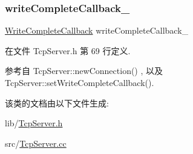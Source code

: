 \mbox{\label{classmuduo_1_1TcpServer_a525f0d11cfa2e271600caa30407b6150}} 
\subsubsection{\texorpdfstring{write\+Complete\+Callback\+\_\+}{writeCompleteCallback\_}}
{\footnotesize\ttfamily \hyperlink{namespacemuduo_a605eda27d048a69607942b95735d7087}{Write\+Complete\+Callback} write\+Complete\+Callback\+\_\+\hspace{0.3cm}{\ttfamily [private]}}



在文件 Tcp\+Server.\+h 第 69 行定义.



参考自 Tcp\+Server\+::new\+Connection() , 以及 Tcp\+Server\+::set\+Write\+Complete\+Callback().



该类的文档由以下文件生成\+:\begin{DoxyCompactItemize}
\item 
lib/\hyperlink{TcpServer_8h}{Tcp\+Server.\+h}\item 
src/\hyperlink{TcpServer_8cc}{Tcp\+Server.\+cc}\end{DoxyCompactItemize}
